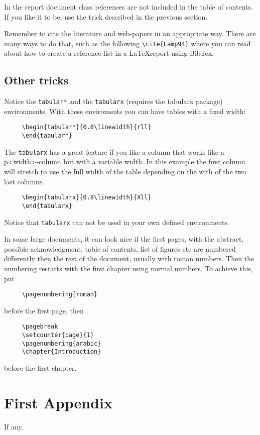 \documentclass[a4paper,11pt,oneside]{report}
\begin{document}
In the report document class references are not included in the
table of contents. If you like it to be, use the trick described in
the previous section.

Remember to cite the literature and web-papers in an appropriate way.  There are
many ways to do that, such as the following \texttt{\textbackslash{}cite\{Lamp94\}} where you
can read about how to create a reference list in a {\LaTeX}\-report using
BibTex.

\section{Other tricks}

Notice the \texttt{tabular*} and the \texttt{tabularx} (requires the
tabularx package) environments. With these enviroments you can have tables
with a fixed width:
\begin{verbatim}
     \begin{tabular*}{0.8\linewidth}{rll}
     \end{tabular*}
\end{verbatim}
The \texttt{tabularx} has a great feature if you like a column that works
like a p{<width>}-column but with a variable width. In this example
the first column will stretch to use the full width of the table
depending on the with of the two last columns.
\begin{verbatim}
     \begin{tabularx}{0.8\linewidth}{Xll}
     \end{tabularx}
\end{verbatim}
Notice that \texttt{tabularx} can not be used in your own defined
environments.


In some large documents, it can look nice if the first pages, with
the abstract, possible acknowledgment, table of contents, list of
figures etc are numbered differently then the rest of the document,
usually with roman numbers. Then the numbering restarts with the
first chapter using normal numbers. To achieve this, put
\begin{verbatim}
     \pagenumbering{roman}
\end{verbatim}
before the first page, then
\begin{verbatim}
     \pagebreak
     \setcounter{page}{1}
     \pagenumbering{arabic}
     \chapter{Introduction}
\end{verbatim}
before the first chapter.





\appendix

\chapter{First Appendix}

If any.
\end{document}
